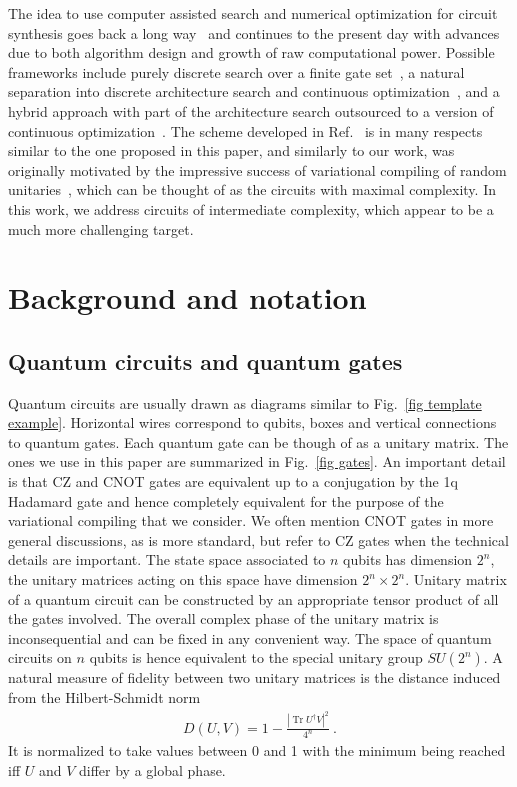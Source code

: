\documentclass[twocolumn, amsfonts, amssymb, aps, nofootinbib]{revtex4-2}
\newcommand{\CZ}{\textsf{CZ }}
\newcommand{\CX}{\textsf{CNOT }}
\begin{document}
The idea to use computer assisted search and numerical optimization for circuit synthesis goes back a long way~\cite{Divincenzo1994} and continues to the present day with advances due to both algorithm design and growth of raw computational power. Possible frameworks include purely discrete search over a finite gate set~\cite{Nagarajan2021}, a natural separation into discrete architecture search and continuous optimization~\cite{Nam2018, Khatri2019, Smith2021}, and a hybrid approach with part of the architecture search outsourced to a version of continuous optimization~\cite{Younis2021, Rakyta2022}. The scheme developed in Ref.~\cite{Rakyta2022} is in many respects similar to the one proposed in this paper, and similarly to our work, was originally motivated by the impressive success of variational compiling of random unitaries~\cite{Kiani2020, Madden2021, Rakyta2021}, which can be thought of as the circuits with maximal complexity. In this work, we address circuits of intermediate complexity, which appear to be a much more challenging target.

\section{Background and notation \label{sec gates}}
\subsection{Quantum circuits and quantum gates}
Quantum circuits are usually drawn as diagrams similar to Fig.~\ref{fig template example}. Horizontal wires correspond to qubits, boxes and vertical connections to quantum gates. Each quantum gate can be though of as a unitary matrix. The ones we use in this paper are summarized in Fig.~\ref{fig gates}. An important detail is that \CZ and \CX gates are equivalent up to a conjugation by the 1q Hadamard gate and hence completely equivalent for the purpose of the variational compiling that we consider. We often mention \CX gates in more general discussions, as is more standard, but refer to \CZ gates when the technical details are important.
The state space associated to $n$ qubits has dimension $2^n$, the unitary matrices acting on this space have dimension $2^n\times 2^n$. Unitary matrix of a quantum circuit can be constructed by an appropriate tensor product of all the gates involved. The overall complex phase of the unitary matrix is inconsequential and can be fixed in any convenient way. The space of quantum circuits on $n$ qubits is hence equivalent to the special unitary group $SU(2^n)$. A natural measure of fidelity between two unitary matrices is the distance induced from the Hilbert-Schmidt norm
\begin{align}
D(U, V)=1-\frac{|\operatorname{Tr}U^\dagger V|^2}{4^n} \ . \label{D hst}
\end{align}
It is normalized to take values between 0 and 1 with the minimum being reached iff $U$ and $V$ differ by a global phase.
\end{document}
